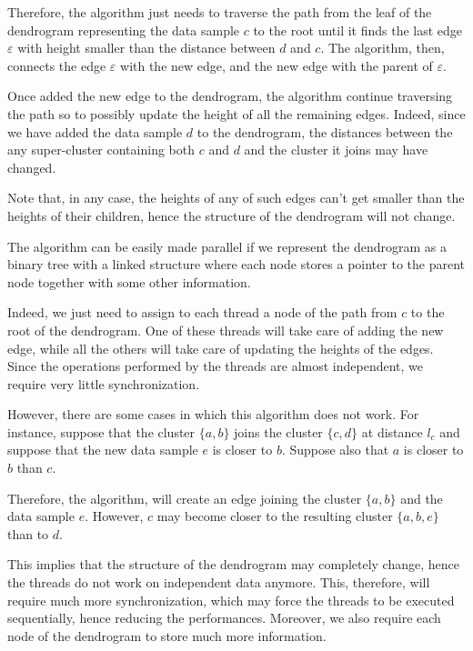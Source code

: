 \documentclass{article}
\begin{document}
Therefore, the algorithm just needs to traverse the path from the leaf of the dendrogram
representing the data sample $c$ to the root until it finds the last edge $\varepsilon$ with height
smaller than the distance between $d$ and $c$.
The algorithm, then, connects the edge $\varepsilon$ with the new edge, and the new edge with the
parent of $\varepsilon$.

Once added the new edge to the dendrogram, the algorithm continue traversing the path so to possibly
update the height of all the remaining edges.
Indeed, since we have added the data sample $d$ to the dendrogram, the distances between the
any super-cluster containing both $c$ and $d$ and the cluster it joins may have changed.

Note that, in any case, the heights of any of such edges can't get smaller than the heights of
their children, hence the structure of the dendrogram will not change.


The algorithm can be easily made parallel if we represent the dendrogram as a binary tree with a
linked structure where each node stores a pointer to the parent node together with some other
information.


Indeed, we just need to assign to each thread a node of the path from $c$ to the root of the
dendrogram. One of these threads will take care of adding the new edge, while all the others will
take care of updating the heights of the edges.
Since the operations performed by the threads are almost independent, we require very little
synchronization.

However, there are some cases in which this algorithm does not work.
For instance, suppose that the cluster $\{a, b\}$ joins the cluster $\{c, d\}$ at distance $l_c$
and suppose that the new data sample $e$ is closer to $b$.
Suppose also that $a$ is closer to $b$ than $c$.

Therefore, the algorithm, will create an edge joining the cluster $\{a, b\}$ and the data sample
$e$. However, $c$ may become closer to the resulting cluster $\{a, b, e\}$ than to $d$.

This implies that the structure of the dendrogram may completely change, hence the threads do not
work on independent data anymore.
This, therefore, will require much more synchronization, which may force the threads to be
executed sequentially, hence reducing the performances.
Moreover, we also require each node of the dendrogram to store much more information.
\end{document}
